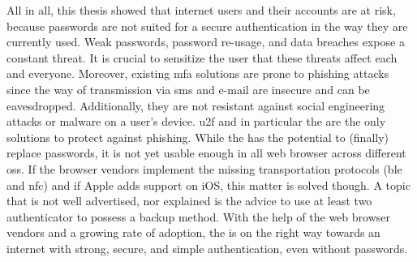 All in all, this thesis showed that internet users and their accounts are at risk, because passwords are not suited for a secure authentication in the way they are currently used. Weak passwords, password re-usage, and data breaches expose a constant threat. It is crucial to sensitize the user that these threats affect each and everyone. Moreover, existing \gls{mfa} solutions are prone to phishing attacks since the way of transmission via \gls{sms} and e-mail are insecure and can be eavesdropped. Additionally, they are not resistant against social engineering attacks or malware on a user's device. \gls{u2f} and in particular the \wa{} are the only solutions to protect against phishing. While the \wa{} has the potential to (finally) replace passwords, it is not yet usable enough in all web browser across different \glspl{os}. If the browser vendors implement the missing transportation protocols (\gls{ble} and \gls{nfc}) and if Apple adds support on iOS, this matter is solved though. A topic that is not well advertised, nor explained is the advice to use at least two authenticator to possess a backup method. With the help of the web browser vendors and a growing rate of adoption, the \wa{} is on the right way towards an internet with strong, secure, and simple authentication, even without passwords.